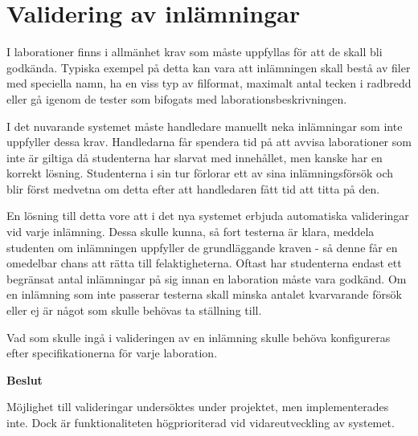 \section{Validering av inlämningar}

I laborationer finns i allmänhet krav som måste uppfyllas för att de skall bli godkända. Typiska exempel på detta kan vara att inlämningen skall bestå av filer med speciella namn, ha en viss typ av filformat, maximalt antal tecken i radbredd eller gå igenom de tester som bifogats med laborationsbeskrivningen.

I det nuvarande systemet måste handledare manuellt neka inlämningar som inte uppfyller dessa krav. Handledarna får spendera tid på att avvisa laborationer som inte är giltiga då studenterna har slarvat med innehållet, men kanske har en korrekt lösning. Studenterna i sin tur förlorar ett av sina inlämningsförsök och blir först medvetna om detta efter att handledaren fått tid att titta på den.

En lösning till detta vore att i det nya systemet erbjuda automatiska valideringar vid varje inlämning. Dessa skulle kunna, så fort testerna är klara, meddela studenten om inlämningen uppfyller de grundläggande kraven - så denne får en omedelbar chans att rätta till felaktigheterna. Oftast har studenterna endast ett begränsat antal inlämningar på sig innan en laboration måste vara godkänd. Om en inlämning som inte passerar testerna skall minska antalet kvarvarande försök eller ej är något som skulle behövas ta ställning till.

Vad som skulle ingå i valideringen av en inlämning skulle behöva konfigureras efter specifikationerna för varje laboration. 

\begin{flushright}
  
  \textbf{Beslut}
  
  Möjlighet till valideringar undersöktes under projektet, men implementerades inte. Dock är funktionaliteten högprioriterad vid vidareutveckling av systemet.
  
\end{flushright}